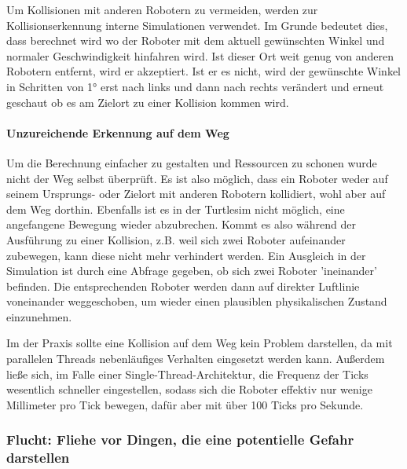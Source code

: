 Um Kollisionen mit anderen Robotern zu vermeiden, werden zur Kollisionserkennung interne Simulationen verwendet. Im Grunde bedeutet dies, dass berechnet wird wo der Roboter mit dem aktuell gewünschten Winkel und normaler Geschwindigkeit hinfahren wird. Ist dieser Ort weit genug von anderen Robotern entfernt, wird er akzeptiert. Ist er es nicht, wird der gewünschte Winkel in Schritten von 1° erst nach links und dann nach rechts verändert und erneut geschaut ob es am Zielort zu einer Kollision kommen wird.

\paragraph*{Unzureichende Erkennung auf dem Weg}
Um die Berechnung einfacher zu gestalten und Ressourcen zu schonen wurde nicht der Weg selbst überprüft. Es ist also möglich, dass ein Roboter weder auf seinem Ursprungs- oder Zielort mit anderen Robotern kollidiert, wohl aber auf dem Weg dorthin. Ebenfalls ist es in der Turtlesim nicht möglich, eine angefangene Bewegung wieder abzubrechen. Kommt es also während der Ausführung zu einer Kollision, z.B. weil sich zwei Roboter aufeinander zubewegen, kann diese nicht mehr verhindert werden. Ein Ausgleich in der Simulation ist durch eine Abfrage gegeben, ob sich zwei Roboter 'ineinander' befinden. Die entsprechenden Roboter werden dann auf direkter Luftlinie voneinander weggeschoben, um wieder einen plausiblen physikalischen Zustand einzunehmen.

Im der Praxis sollte eine Kollision auf dem Weg kein Problem darstellen, da mit parallelen Threads nebenläufiges Verhalten eingesetzt werden kann. Außerdem ließe sich, im Falle einer Single-Thread-Architektur, die Frequenz der Ticks wesentlich schneller eingestellen, sodass sich die Roboter effektiv nur wenige Millimeter pro Tick bewegen, dafür aber mit über 100 Ticks pro Sekunde.%

\subsubsection*{Flucht: Fliehe vor Dingen, die eine potentielle Gefahr darstellen}

